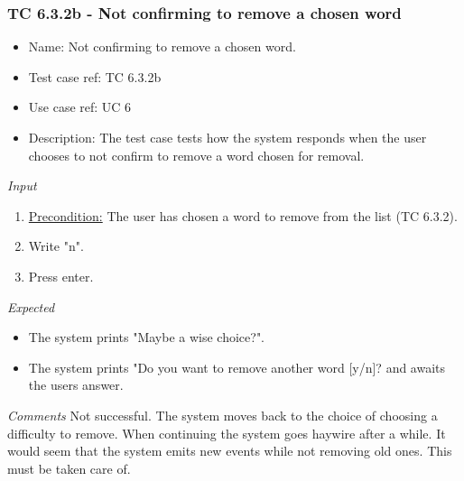 \documentclass[12pt, letterpaper]{article}
\begin{document}
\subsubsection{TC 6.3.2b - Not confirming to remove a chosen word}
\begin{itemize}
	\item Name: Not confirming to remove a chosen word.
	\item Test case ref: TC 6.3.2b
	\item Use case ref: UC 6
	\item Description: The test case tests how the system responds when the user chooses to not confirm to remove a word chosen for removal.
\end{itemize}
\emph{Input}
\begin{enumerate}
	\item \underline{Precondition:} The user has chosen a word to remove from the list (TC 6.3.2).
	\item Write "n".
	\item Press enter.
\end{enumerate}
\emph{Expected}
\begin{itemize}
	\item The system prints "Maybe a wise choice?".
	\item The system prints "Do you want to remove another word [y/n]? and awaits the users answer.
\end{itemize}
\begin{Form}
	\newline
	\newline
\end{Form}
\newline
\emph{Comments}
Not successful. The system moves back to the choice of choosing a difficulty to remove. When continuing the system goes haywire after a while. It would seem that the system emits new events while not removing old ones. This must be taken care of.
\end{document}
